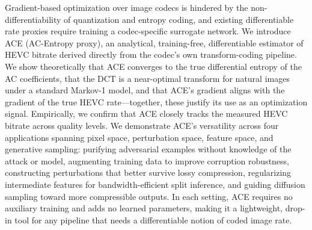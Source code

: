 Gradient-based optimization over image codecs is hindered by the non-differentiability of quantization and entropy coding, and existing differentiable rate proxies require training a codec-specific surrogate network. 
We introduce ACE (AC-Entropy proxy), an analytical, training-free, differentiable estimator of HEVC bitrate derived directly from the codec's own transform-coding pipeline. 
We show theoretically that ACE converges to the true differential entropy of the AC coefficients, that the DCT is a near-optimal transform for natural images under a standard Markov-1 model, and that ACE's gradient aligns with the gradient of the true HEVC rate—together, these justify its use as an optimization signal. 
Empirically, we confirm that ACE closely tracks the measured HEVC bitrate across quality levels. 
We demonstrate ACE's versatility across four applications spanning pixel space, perturbation space, feature space, and generative sampling: purifying adversarial examples without knowledge of the attack or model, augmenting training data to improve corruption robustness, constructing perturbations that better survive lossy compression, regularizing intermediate features for bandwidth-efficient split inference, and guiding diffusion sampling toward more compressible outputs. 
In each setting, ACE requires no auxiliary training and adds no learned parameters, making it a lightweight, drop-in tool for any pipeline that needs a differentiable notion of coded image rate.